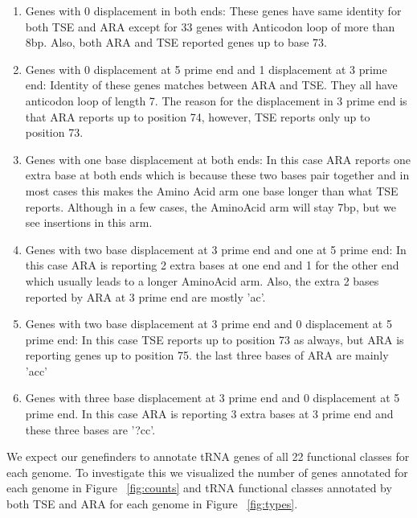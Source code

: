 \documentclass[
10pt, %
a4paper, %
oneside, %
headinclude,footinclude, %
BCOR5mm, %
]{scrartcl}
\begin{document}
\begin{enumerate}[noitemsep]

\item Genes with 0 displacement in both ends: These genes have same identity for both TSE and ARA except for 33 genes with Anticodon loop of more than 8bp. Also, both ARA and TSE reported genes up to base 73. 
\item Genes with 0 displacement at 5 prime end and 1 displacement at 3 prime end: Identity of these genes matches between ARA and TSE. They all have anticodon loop of length 7. The reason for the displacement in 3 prime end is that ARA reports up to position 74, however, TSE reports only up to position 73.  
\item Genes with one base displacement at both ends: In this case ARA reports one extra base at both ends which is because these two bases pair together and in most cases this makes the Amino Acid arm one base longer than what TSE reports. Although in a few cases, the AminoAcid arm will stay 7bp, but we see insertions in this arm.  
\item Genes with two base displacement at 3 prime end and one at 5 prime end: In this case ARA is reporting 2 extra bases at one end and 1 for the other end which usually leads to a longer AminoAcid arm. Also, the extra 2 bases reported by ARA at 3 prime end are mostly 'ac'.  
\item Genes with two base displacement at 3 prime end and 0 displacement at 5 prime end: In this case TSE reports up to position 73 as always, but ARA is reporting genes up to position 75. the last three bases of ARA are mainly 'acc'
\item Genes with three base displacement at 3 prime end and 0 displacement at 5 prime end. In this case ARA is reporting 3 extra bases at 3 prime end and these three bases are '?cc'.


\end{enumerate} 


We expect our genefinders to annotate tRNA genes of all 22 functional classes for each genome. To investigate this we visualized the number of genes annotated for each genome in Figure ~\ref{fig:counts} and tRNA functional classes annotated by both TSE and ARA for each genome in Figure ~\ref{fig:types}.
\end{document}

